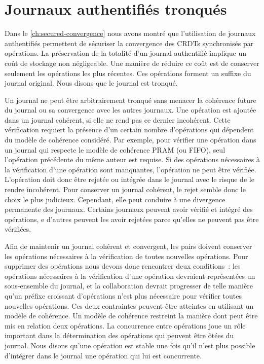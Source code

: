 
\chapter{Journaux authentifiés tronqués}
\label{ch:pruned-log}
\minitoc
\bigskip


Dans le \autoref{ch:secured-convergence} nous avons montré que l'utilisation de journaux authentifiés permettent de sécuriser la convergence des \acp{CRDT} synchronisés par opérations.
La préservation de la totalité d'un journal authentifié implique un coût de stockage non négligeable.
Une manière de réduire ce coût est de conserver seulement les opérations les plus récentes.
Ces opérations forment un suffixe du journal original.
Nous disons que le journal est tronqué.


Un journal ne peut être arbitrairement tronqué sans menacer la cohérence future du journal ou sa convergence avec les autres journaux.
Une opération est ajoutée dans un journal cohérent, si elle ne rend pas ce dernier incohérent.
Cette vérification requiert la présence d'un certain nombre d'opérations qui dépendent du modèle de cohérence considéré.
Par exemple, pour vérifier une opération dans un journal qui respecte le modèle de cohérence PRAM (ou FIFO), seul l'opération précédente du même auteur est requise.
Si des opérations nécessaires à la vérification d'une opération sont manquantes, l'opération ne peut être vérifiée.
L'opération doit donc être rejetée ou intégrée dans le journal avec le risque de le rendre incohérent.
Pour conserver un journal cohérent, le rejet semble donc le choix le plus judicieux.
Cependant, elle peut conduire à une divergence permanente des journaux.
Certains journaux peuvent avoir vérifié et intégré des opérations, e d'autres peuvent les avoir rejetées parce qu'elles ne peuvent pas être vérifiées.

Afin de maintenir un journal cohérent et convergent, les pairs doivent conserver les opérations nécessaires à la vérification de toutes nouvelles opérations.
Pour supprimer des opérations nous devons donc rencontrer deux conditions~: les opérations nécessaires à la vérification d'une opération devraient représentées un sous-ensemble du journal, et la collaboration devrait progresser de telle manière qu'un préfixe croissant d'opérations n'est plus nécessaire pour vérifier toutes nouvelles opérations.
Ces deux contraintes peuvent être atteintes en utilisant un modèle de cohérence.
Un modèle de cohérence restreint la manière dont peut être mis en relation deux opérations.
La concurrence entre opérations joue un rôle important dans la détermination des opérations qui peuvent être ôtées du journal.
Nous disons qu'une opération est stable une fois qu'il n'est plus possible d'intégrer dans le journal une opération qui lui est concurrente.

